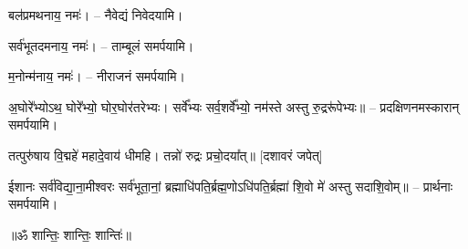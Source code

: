 बल॑प्रमथनाय॒ नमः॑। – नैवेद्यं निवेदयामि।

सर्व॑भूतदमनाय॒ नमः॑। – ताम्बूलं समर्पयामि।

म॒नोन्म॑नाय॒ नमः॑। – नीराजनं समर्पयामि।

अ॒घोरे᳚भ्योऽथ॒ घोरे᳚भ्यो॒ घोर॒घोर॑तरेभ्यः। सर्वे᳚भ्यः सर्व॒शर्वे᳚भ्यो॒ नम॑स्ते अस्तु रु॒द्ररू॑पेभ्यः॥ – प्रदक्षिणनमस्कारान् समर्पयामि।

तत्पुरु॑षाय वि॒द्महे॑ महादे॒वाय॑ धीमहि। तन्नो॑ रुद्रः प्रचो॒दया᳚त्॥ [दशावरं जपेत्]

ईशानः सर्व॑विद्या॒ना॒मीश्वरः सर्व॑भूता॒नां॒ ब्रह्माधि॑पति॒\dot{}र्ब्रह्म॒णोऽधि॑पति॒\dot{}र्ब्रह्मा॑ शि॒वो मे॑ अस्तु सदाशि॒वोम्॥ – प्रार्थनाः समर्पयामि।

\centerline{॥ॐ शान्तिः॒ शान्तिः॒ शान्तिः॑॥}

{\small \closesection}
